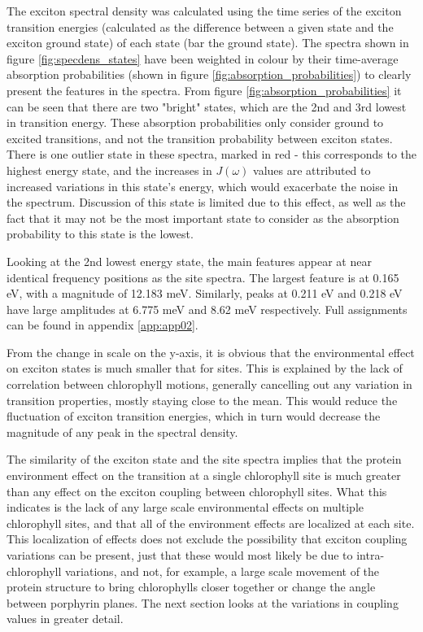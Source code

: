 The exciton spectral density was calculated using the time series of the exciton
transition energies (calculated as the difference between a given state and the
exciton ground state) of each state (bar the ground state). The spectra shown in 
figure \ref{fig:specdens_states} have been weighted in colour by their time-average
absorption probabilities (shown in figure \ref{fig:absorption_probabilities}) to
clearly present the features in the spectra. From figure \ref{fig:absorption_probabilities}
it can be seen that there are two "bright" states, which are the 2nd and 3rd lowest
in transition energy. These absorption probabilities only consider ground to excited 
transitions, and not the transition probability between exciton states. There is
one outlier state in these spectra, marked in red - this corresponds to the highest
energy state, and the increases in $J\left(\omega\right)$ values are attributed 
to increased variations in this state's energy, which would exacerbate the noise 
in the spectrum. Discussion of this state is limited due to this effect, as well 
as the fact that it may not be the most important state to consider as the absorption
probability to this state is the lowest.

Looking at the 2nd lowest energy state, the main features appear at near identical
frequency positions as the site spectra. The largest feature is at 0.165 eV, with
a magnitude of 12.183 meV. Similarly, peaks at 0.211 eV and 0.218 eV have large
amplitudes at 6.775 meV and 8.62 meV respectively. Full assignments can be found
in appendix \ref{app:app02}.

From the change in scale on the y-axis, it is obvious that the environmental effect
on exciton states is much smaller that for sites. This is explained by the lack
of correlation between chlorophyll motions, generally cancelling out any variation
in \Qy transition properties, mostly staying close to the mean. This would reduce
the fluctuation of exciton transition energies, which in turn would decrease the
magnitude of any peak in the spectral density.

The similarity of the exciton state and the site spectra implies that the protein
environment effect on the transition at a single chlorophyll site is much greater 
than any effect on the exciton coupling between chlorophyll sites. What this indicates
is the lack of any large scale environmental effects on multiple chlorophyll sites,
and that all of the environment effects are localized at each site. This localization
of effects does not exclude the possibility that exciton coupling variations can 
be present, just that these would most likely be due to intra-chlorophyll variations, 
and not, for example, a large scale movement of the protein structure to bring chlorophylls
closer together or change the angle between porphyrin planes. The next section looks 
at the variations in coupling values in greater detail.

